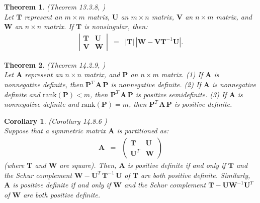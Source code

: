 \documentclass[a4paper]{article}
\theoremstyle{myexamplestyle}
\newtheorem{ther}{Theorem}
\newtheorem{coro}{Corollary}
\begin{document}
\begin{ther} ({\it Theorem 13.3.8}, \citealp{Har2008})
\\
Let $\mathbf{T}$ represent an $m \times m$ matrix, $\mathbf{U}$ an $m \times n$ matrix, $\mathbf{V}$ an $n \times m$ matrix, and $\mathbf{W}$ an $n \times n$ matrix. If $\mathbf{T}$ is nonsingular, then:
\begin{eqnarray*}
\left| \begin{array}{cc} \mathbf{T} & \mathbf{U} \\ \mathbf{V} & \mathbf{W} \end{array} \right| & = & |\mathbf{T}| \, | \mathbf{W} - \mathbf{V} \mathbf{T}^{-1} \mathbf{U} |.
\end{eqnarray*}
\end{ther}


\begin{ther} ({\it Theorem 14.2.9}, \citealp{Har2008})
\\
\citep{Har2008} Let $\mathbf{A}$ represent an $n \times n$ matrix, and $\mathbf{P}$ an $n \times m$ matrix. (1) If $\mathbf{A}$
is nonnegative definite, then $\mathbf{P}^T \, \mathbf{A} \, \mathbf{P}$ is nonnegative definite. (2) If $\mathbf{A}$ is nonnegative definite and $\mbox{rank}(\mathbf{P}) < m$, then $\mathbf{P}^T \, \mathbf{A} \, \mathbf{P}$ is positive semidefinite. (3) If $\mathbf{A}$ is nonnegative definite and $\mbox{rank}(\mathbf{P}) = m$, then $\mathbf{P}^T \, \mathbf{A} \, \mathbf{P}$ is positive definite.
\end{ther}

\begin{coro} ({\it Corollary 14.8.6} \citealp{Har2008})
\\
Suppose that a symmetric matrix $\mathbf{A}$ is partitioned as:
\begin{eqnarray*}
\mathbf{A} & = &  \left( \begin{array}{cc} \mathbf{T} & \mathbf{U} \\ \mathbf{U}^T & \mathbf{W} \end{array} \right)
\end{eqnarray*}
(where $\mathbf{T}$ and $\mathbf{W}$ are square). Then, $\mathbf{A}$ is positive definite if and only if $\mathbf{T}$ and the Schur complement $\mathbf{W} - \mathbf{U}^T \, \mathbf{T}^{-1} \, \mathbf{U}$ of $\mathbf{T}$ are both positive definite. Similarly, $\mathbf{A}$ is positive definite if and only if $\mathbf{W}$ and the Schur complement $\mathbf{T} - \mathbf{U} \mathbf{W}^{-1} \mathbf{U}^T$ of $\mathbf{W}$ are both positive definite.
\end{coro}
\end{document}
